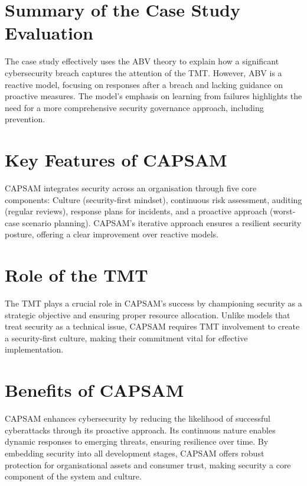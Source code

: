 \section{Summary of the Case Study Evaluation}
The case study effectively uses the ABV theory to explain how a significant cybersecurity breach captures the attention of the TMT. However, ABV is a reactive model, focusing on responses after a breach and lacking guidance on proactive measures. The model's emphasis on learning from failures highlights the need for a more comprehensive security governance approach, including prevention.

\section{Key Features of CAPSAM}
CAPSAM integrates security across an organisation through five core components: Culture (security-first mindset), continuous risk assessment, auditing (regular reviews), response plans for incidents, and a proactive approach (worst-case scenario planning). CAPSAM's iterative approach ensures a resilient security posture, offering a clear improvement over reactive models.

\section{Role of the TMT}
The TMT plays a crucial role in CAPSAM's success by championing security as a strategic objective and ensuring proper resource allocation. Unlike models that treat security as a technical issue, CAPSAM requires TMT involvement to create a security-first culture, making their commitment vital for effective implementation.

\section{Benefits of CAPSAM}
CAPSAM enhances cybersecurity by reducing the likelihood of successful cyberattacks through its proactive approach. Its continuous nature enables dynamic responses to emerging threats, ensuring resilience over time. By embedding security into all development stages, CAPSAM offers robust protection for organisational assets and consumer trust, making security a core component of the system and culture.